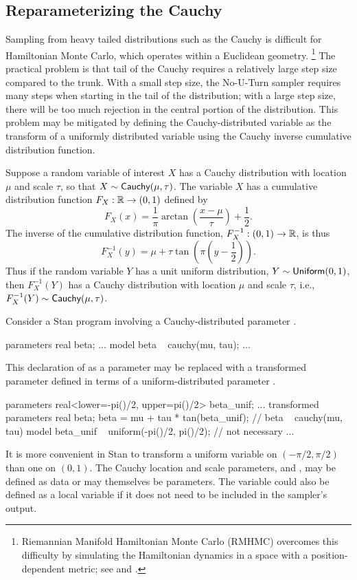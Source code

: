 \subsection{Reparameterizing the Cauchy}

Sampling from heavy tailed distributions such as the Cauchy is
difficult for Hamiltonian Monte Carlo, which operates within a
Euclidean geometry.%
%
\footnote{Riemannian Manifold Hamiltonian Monte Carlo (RMHMC) overcomes
  this difficulty by simulating the Hamiltonian dynamics in a space
  with a position-dependent metric; see
  \citep{GirolamiCalderhead:2011} and \citep{Betancourt:2012}.}
%
The practical problem is that tail of the Cauchy
requires a relatively large step size compared to the trunk.  With a
small step size, the No-U-Turn sampler requires many steps when
starting in the tail of the distribution; with a large step size,
there will be too much rejection in the central portion of the
distribution.  This problem may be mitigated by defining the
Cauchy-distributed variable as the transform of a uniformly
distributed variable using the Cauchy inverse cumulative distribution
function.

Suppose a random variable of interest $X$ has a Cauchy distribution
with location $\mu$ and scale $\tau$, so that $X \sim
\mbox{\sf Cauchy}(\mu,\tau)$.  The variable $X$ has a cumulative
distribution function $F_X:\mathbb{R} \rightarrow (0,1)$ defined by
\[
F_X(x) = \frac{1}{\pi} \arctan \left( \frac{x - \mu}{\tau} \right) +
\frac{1}{2}.
\]
The inverse of the cumulative distribution function,
$F_X^{-1}:(0,1) \rightarrow \mathbb{R}$, is thus
%
\[
F^{-1}_X(y) = \mu + \tau \tan \left( \pi \left( y - \frac{1}{2} \right) \right).
\]
Thus if the random variable $Y$ has a unit uniform distribution, $Y
\sim \mbox{\sf Uniform}(0,1)$, then $F^{-1}_X(Y)$ has a Cauchy
distribution with location $\mu$ and scale $\tau$, i.e., $F^{-1}_X(Y) \sim
\mbox{\sf Cauchy}(\mu,\tau)$.

Consider a Stan program involving a Cauchy-distributed parameter
.
%
\begin{stancode}
parameters {
  real beta;
  ...
}
model {
  beta ~ cauchy(mu, tau);
  ...
}
\end{stancode}
%
This declaration of  as a parameter may be replaced with a
transformed parameter  defined in terms of a
uniform-distributed parameter .
%
\begin{stancode}
parameters {
  real<lower=-pi()/2, upper=pi()/2> beta_unif;
  ...
}
transformed parameters {
  real beta;
  beta = mu + tau * tan(beta_unif);  // beta ~ cauchy(mu, tau)
}
model {
  beta_unif ~ uniform(-pi()/2, pi()/2);  // not necessary
  ...
}
\end{stancode}
%
It is more convenient in Stan to transform a uniform variable on
$(-\pi/2, \pi/2)$ than one on $(0,1)$.  The Cauchy location and scale
parameters,  and , may be defined as data or may
themselves be parameters.  The variable  could also be
defined as a local variable if it does not need to be included in the
sampler's output.

